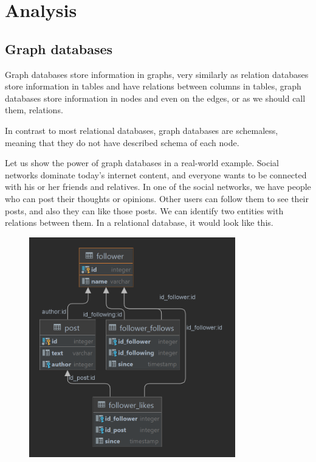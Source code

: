 \chapter {Analysis}

\section {Graph databases}

Graph databases store information in graphs, very similarly as relation databases store information in tables and have relations between columns in tables, graph databases store information in nodes and even on the edges, or as we should call them, relations.

In contrast to most relational databases, graph databases are schemaless, meaning that they do not have described schema of each node.

Let us show the power of graph databases in a real-world example. Social networks dominate today's internet content, and everyone wants to be connected with his or her friends and relatives. In one of the social networks, we have people who can post their thoughts or opinions.
Other users can follow them to see their posts, and also they can like those posts. We can identify two entities with relations between them. In a relational database, it would look like this.

\begin{figure}[H]
    \centering
    \includegraphics[width=0.8\textwidth]{content/relational-dbms-social-network.png}
\end{figure}

